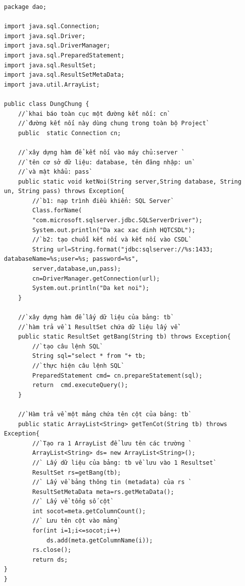   
\begin{lstlisting}[escapechar=`]
package dao;

import java.sql.Connection;
import java.sql.Driver;
import java.sql.DriverManager;
import java.sql.PreparedStatement;
import java.sql.ResultSet;
import java.sql.ResultSetMetaData;
import java.util.ArrayList;

public class DungChung {
	//`khai báo toàn cục một đường kết nối: cn`
	//`đường kết nối này dùng chung trong toàn bộ Project`
	public  static Connection cn;
	
	//`xây dựng hàm để kết nối vào máy chủ:server `
	//`tên cơ sở dữ liệu: database, tên đăng nhập: un`
	//`và mật khẩu: pass`
	public static void ketNoi(String server,String database, String un, String pass) throws Exception{
		//`b1: nạp trình điều khiển: SQL Server`
		Class.forName(
		"com.microsoft.sqlserver.jdbc.SQLServerDriver");
		System.out.println("Da xac xac dinh HQTCSDL");
		//`b2: tạo chuỗi kết nối và kết nối vào CSDL`
		String url=String.format("jdbc:sqlserver://%s:1433; databaseName=%s;user=%s; password=%s",
		server,database,un,pass);
		cn=DriverManager.getConnection(url);
		System.out.println("Da ket noi");
	}
	
	//`xây dựng hàm để lấy dữ liệu của bảng: tb`
	//`hàm trả về 1 ResultSet chứa dữ liệu lấy về`
	public static ResultSet getBang(String tb) throws Exception{
		//`tạo câu lệnh SQL`
		String sql="select * from "+ tb;
		//`thực hiện câu lệnh SQL`
		PreparedStatement cmd= cn.prepareStatement(sql);
		return  cmd.executeQuery();
	}
	
	//`Hàm trả về một mảng chứa tên cột của bảng: tb`
	public static ArrayList<String> getTenCot(String tb) throws Exception{
		//`Tạo ra 1 ArrayList để lưu tên các trường `
		ArrayList<String> ds= new ArrayList<String>();
		//` Lấy dữ liệu của bảng: tb về lưu vào 1 Resultset`
		ResultSet rs=getBang(tb);
		//` Lấy về bảng thông tin (metadata) của rs `
		ResultSetMetaData meta=rs.getMetaData();
		//` Lấy về tổng số cột`
		int socot=meta.getColumnCount();
		//` Lưu tên cột vào mảng`
		for(int i=1;i<=socot;i++)
			ds.add(meta.getColumnName(i));
		rs.close();
		return ds;
}
}
\end{lstlisting} 

